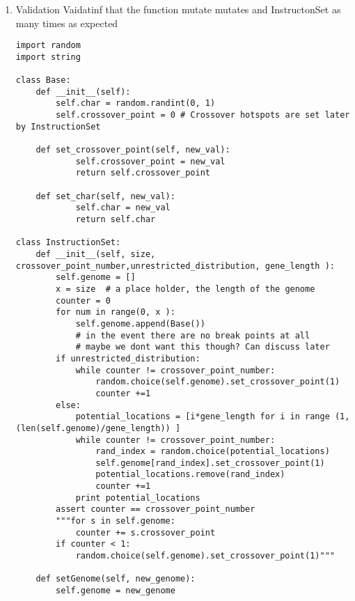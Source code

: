 \documentclass[a4paper]{article}
\begin{document}
\begin{enumerate}
\item Validation
\label{sec-6-3-2-1}
Vaidatinf that the function mutate mutates and InstructonSet as many times as expected
\begin{verbatim}
import random
import string

class Base:
    def __init__(self):
        self.char = random.randint(0, 1)
        self.crossover_point = 0 # Crossover hotspots are set later by InstructionSet

    def set_crossover_point(self, new_val):
            self.crossover_point = new_val
            return self.crossover_point

    def set_char(self, new_val):
            self.char = new_val
            return self.char

class InstructionSet:
    def __init__(self, size, crossover_point_number,unrestricted_distribution, gene_length ):
        self.genome = []
        x = size  # a place holder, the length of the genome
        counter = 0 
        for num in range(0, x ):
            self.genome.append(Base())
            # in the event there are no break points at all
            # maybe we dont want this though? Can discuss later
        if unrestricted_distribution:
            while counter != crossover_point_number:
                random.choice(self.genome).set_crossover_point(1)
                counter +=1 
        else:
            potential_locations = [i*gene_length for i in range (1, (len(self.genome)/gene_length)) ]
            while counter != crossover_point_number:
                rand_index = random.choice(potential_locations)
                self.genome[rand_index].set_crossover_point(1)
                potential_locations.remove(rand_index)
                counter +=1
            print potential_locations
        assert counter == crossover_point_number 
        """for s in self.genome:
            counter += s.crossover_point
        if counter < 1:
            random.choice(self.genome).set_crossover_point(1)"""

    def setGenome(self, new_genome):
        self.genome = new_genome



\end{verbatim}
\end{enumerate}
\end{document}
